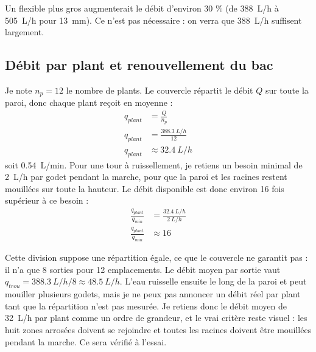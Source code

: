 Un flexible plus gros augmenterait le débit d'environ 30 \% (de \qty{388}{L/h} à \qty{505}{L/h} pour \qty{13}{mm}). Ce n'est pas nécessaire : on verra que \qty{388}{L/h} suffisent largement.

\subsection{Débit par plant et renouvellement du bac}

\begin{demonstration}
Je note $n_p = 12$ le nombre de plants. Le couvercle répartit le débit $Q$ sur toute la paroi, donc chaque plant reçoit en moyenne :
\begin{align*}
q_{plant} &= \frac{Q}{n_p}\\
q_{plant} &= \frac{\qty{388,3}{L/h}}{12}\\
q_{plant} &\approx \qty{32,4}{L/h}
\end{align*}
soit \qty{0,54}{L/min}. Pour une tour à ruissellement, je retiens un besoin minimal de \qty{2}{L/h} par godet pendant la marche, pour que la paroi et les racines restent mouillées sur toute la hauteur. Le débit disponible est donc environ 16 fois supérieur à ce besoin :
\begin{align*}
\frac{q_{plant}}{q_{min}} &= \frac{\qty{32,4}{L/h}}{\qty{2}{L/h}}\\
\frac{q_{plant}}{q_{min}} &\approx 16
\end{align*}
\end{demonstration}

Cette division suppose une répartition égale, ce que le couvercle ne garantit pas : il n'a que 8 sorties pour 12 emplacements. Le débit moyen par sortie vaut $q_{trou} = \qty{388,3}{L/h} / 8 \approx \qty{48,5}{L/h}$. L'eau ruisselle ensuite le long de la paroi et peut mouiller plusieurs godets, mais je ne peux pas annoncer un débit réel par plant tant que la répartition n'est pas mesurée. Je retiens donc le débit moyen de \qty{32}{L/h} par plant comme un ordre de grandeur, et le vrai critère reste visuel : les huit zones arrosées doivent se rejoindre et toutes les racines doivent être mouillées pendant la marche. Ce sera vérifié à l'essai.

